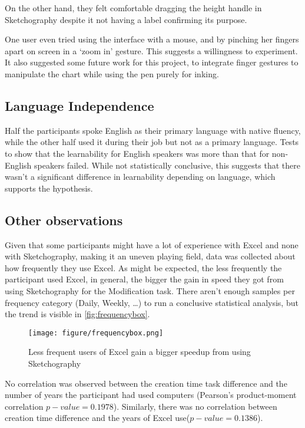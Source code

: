 On the other hand, they felt comfortable dragging the height handle in Sketchography despite it not having a label confirming its purpose.

One user even tried using the interface with a mouse, and by pinching her fingers apart on screen in a `zoom in' gesture. This suggests a willingness to experiment. It also suggested some future work for this project, to integrate finger gestures to manipulate the chart while using the pen purely for inking.

\subsection{Language Independence}
Half the participants spoke English as their primary language with native fluency, while the other half used it during their job but not as a primary language. Tests to show that the learnability for English speakers was more than that for non-English speakers failed. While not statistically conclusive, this suggests that there wasn't a significant difference in learnability depending on language, which supports the hypothesis.

\subsection{Other observations}
Given that some participants might have a lot of experience with Excel and none with Sketchography, making it an uneven playing field, data was collected about how frequently they use Excel. As might be expected, the less frequently the participant used Excel, in general, the bigger the gain in speed they got from using Sketchography for the Modification task. There aren't enough samples per frequency category (Daily, Weekly, \ldots) to run a conclusive statistical analysis, but the trend is visible in \autoref{fig:frequencybox}.

\begin{figure}[H]
\begin{center}
\texttt{[image: figure/frequencybox.png]}
\end{center}
\caption{Less frequent users of Excel gain a bigger speedup from using Sketchography}
\label{fig:frequencybox}
\end{figure}


No correlation was observed between the creation time task difference and the number of years the participant had used computers (Pearson's product-moment correlation $p-value = 0.1978$). Similarly, there was no correlation between creation time difference and the years of Excel use($p-value = 0.1386$).  

